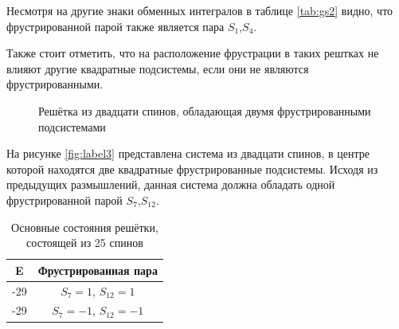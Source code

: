 \documentclass[utf8, babel, sor, jor, amsmath, amssymb, reprint]{elsarticle} %
\begin{document}
Несмотря на другие знаки обменных интегралов в таблице \eqref{tab:gs2} видно, что фрустрированной парой также является пара $S_1$,$S_4$.

Также стоит отметить, что на расположение фрустрации в таких рештках не влияют другие квадратные подсистемы, если они не являются фрустрированными.

\begin{figure}[h]
	\centering
	\caption{Решётка из двадцати спинов, обладающая двумя фрустрированными подсистемами}
	\label{fig:label3}
\end{figure}

На рисунке \eqref{fig:label3} представлена система из двадцати спинов, в центре которой находятся две квадратные фрустрированные подсистемы. Исходя из предыдущих размышлений, данная система должна обладать одной фрустрированной парой  $S_7$,$S_12$.

\begin{table}[h]
	\centering
	\begin{tabular}{|c|c|}
		\hline
		E   &   Фрустрированная пара \\
		\hline
		-29   &  $S_7=1$, $S_{12}=1$ \\
		\hline
		-29   &   $S_7=-1$, $S_{12}=-1$ \\
		\hline
	\end{tabular}
	\caption{Основные состояния решётки, состоящей из 25 спинов}
	\label{tab:gs3}
\end{table}
\end{document}
